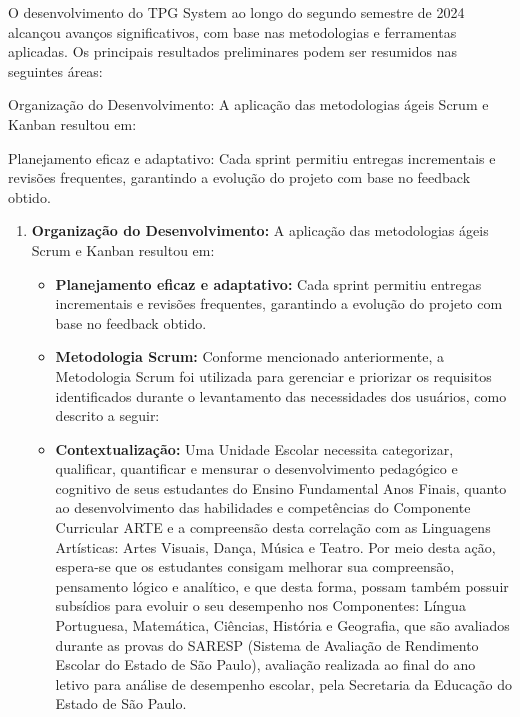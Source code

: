 O desenvolvimento do TPG System ao longo do segundo semestre de 2024 alcançou avanços significativos, com base nas metodologias e ferramentas aplicadas. Os principais resultados preliminares podem ser resumidos nas seguintes áreas: 

Organização do Desenvolvimento: A aplicação das metodologias ágeis Scrum e Kanban resultou em: 

Planejamento eficaz e adaptativo: Cada sprint permitiu entregas incrementais e revisões frequentes, garantindo a evolução do projeto com base no feedback obtido. 

\begin{enumerate}[label=\arabic*)]
    \item \textbf{Organização do Desenvolvimento:} 
    A aplicação das metodologias ágeis Scrum e Kanban resultou em:
    
    \begin{itemize}[leftmargin=2em]
        \item \textbf{Planejamento eficaz e adaptativo:} Cada sprint permitiu entregas incrementais e revisões frequentes, garantindo a evolução do projeto com base no feedback obtido.
    \end{itemize}
    
    \begin{itemize}[leftmargin=2em]
        \item \textbf{Metodologia Scrum:} Conforme mencionado anteriormente, a Metodologia Scrum foi utilizada para gerenciar e priorizar os requisitos identificados durante o levantamento das necessidades dos usuários, como descrito a seguir:
    \end{itemize}
    
    \begin{itemize}[leftmargin=2em]
        \item \textbf{Contextualização:} 
        Uma Unidade Escolar necessita categorizar, qualificar, quantificar e mensurar o desenvolvimento pedagógico e cognitivo de seus estudantes do Ensino Fundamental Anos Finais, quanto ao desenvolvimento das habilidades e competências do Componente Curricular ARTE e a compreensão desta correlação com as Linguagens Artísticas: Artes Visuais, Dança, Música e Teatro. 
        Por meio desta ação, espera-se que os estudantes consigam melhorar sua compreensão, pensamento lógico e analítico, e que desta forma, possam também possuir subsídios para evoluir o seu desempenho nos Componentes: Língua Portuguesa, Matemática, Ciências, História e Geografia, que são avaliados durante as provas do SARESP (Sistema de Avaliação de Rendimento Escolar do Estado de São Paulo), avaliação realizada ao final do ano letivo para análise de desempenho escolar, pela Secretaria da Educação do Estado de São Paulo.
    \end{itemize}


\end{enumerate}
